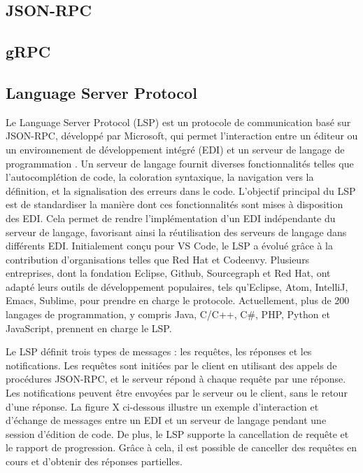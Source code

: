 \subsection{JSON-RPC}

\subsection{gRPC}

\subsection{Language Server Protocol}

Le Language Server Protocol (LSP) est un protocole de communication basé sur JSON-RPC, développé par Microsoft, qui permet l'interaction entre un éditeur ou un environnement de développement intégré (EDI) et un serveur de langage de programmation \cite{Keidel2016}. Un serveur de langage fournit diverses fonctionnalités telles que l'autocomplétion de code, la coloration syntaxique, la navigation vers la définition, et la signalisation des erreurs dans le code. L'objectif principal du LSP est de standardiser la manière dont ces fonctionnalités sont mises à disposition des EDI. Cela permet de rendre l'implémentation d'un EDI indépendante du serveur de langage, favorisant ainsi la réutilisation des serveurs de langage dans différents EDI. Initialement conçu pour VS Code, le LSP a évolué grâce à la contribution d'organisations telles que Red Hat et Codeenvy. Plusieurs entreprises, dont la fondation Eclipse, Github, Sourcegraph et Red Hat, ont adapté leurs outils de développement populaires, tels qu'Eclipse, Atom, IntelliJ, Emacs, Sublime, pour prendre en charge le protocole. Actuellement, plus de 200 langages de programmation, y compris Java, C/C++, C\#, PHP, Python et JavaScript, prennent en charge le LSP.

Le LSP définit trois types de messages : les requêtes, les réponses et les notifications. Les requêtes sont initiées par le client en utilisant des appels de procédures JSON-RPC, et le serveur répond à chaque requête par une réponse. Les notifications peuvent être envoyées par le serveur ou le client, sans le retour d'une réponse. La figure X ci-dessous illustre un exemple d'interaction et d'échange de messages entre un EDI et un serveur de langage pendant une session d'édition de code. De plus, le LSP supporte la cancellation de requête et le rapport de progression. Grâce à cela, il est possible de canceller des requêtes en cours et d'obtenir des réponses partielles.


